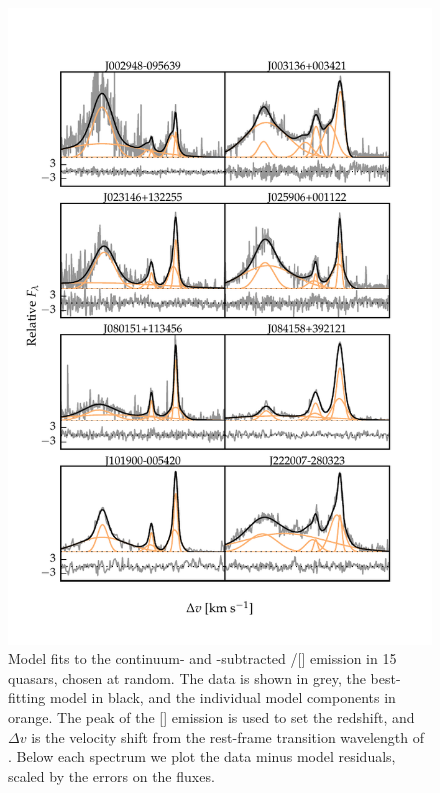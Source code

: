 \begin{figure}
    \centering
    \includegraphics[width=\textwidth]{figures/chapter04/example_spectrum_grid.pdf} 
    \caption[{Model fits to the continuum- and -subtracted \hbns/[] emission in eight quasars, chosen at random.}]{Model fits to the continuum- and -subtracted \hbns/[] emission in 15 quasars, chosen at random. The data is shown in grey, the best-fitting model in black, and the individual model components in orange. The peak of the [] emission is used to set the redshift, and $\Delta{v}$ is the velocity shift from the rest-frame transition wavelength of \hb. Below each spectrum we plot the data minus model residuals, scaled by the errors on the fluxes.}     
    \label{fig:example_spectrum_grid}
\end{figure}

